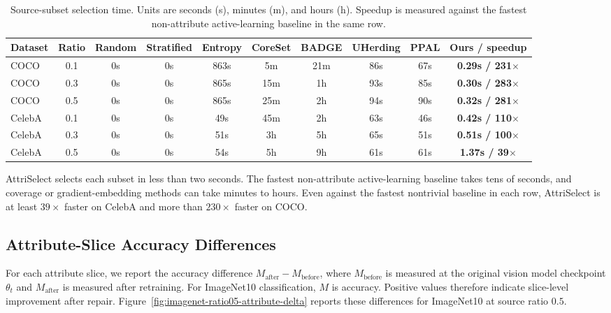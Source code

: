 \documentclass{article}
\newcommand{\model}{AttriSelect\xspace}
\begin{document}
\begin{table}[t]
\centering
\caption{Source-subset selection time. Units are seconds (s), minutes (m), and hours (h). Speedup is measured against the fastest non-attribute active-learning baseline in the same row.}
\label{tab:selection-efficiency}
\footnotesize
\setlength{\tabcolsep}{1.2pt}
\begin{tabular}{l c c c c c c c c c}
\toprule
Dataset & Ratio & Random & Stratified & Entropy & CoreSet & BADGE & UHerding & PPAL & \textbf{Ours / speedup} \\
\midrule
COCO & 0.1 & 0s & 0s & 863s & 5m & 21m & 86s & 67s & \textbf{0.29s / 231$\times$} \\
COCO & 0.3 & 0s & 0s & 865s & 15m & 1h & 93s & 85s & \textbf{0.30s / 283$\times$} \\
COCO & 0.5 & 0s & 0s & 865s & 25m & 2h & 94s & 90s & \textbf{0.32s / 281$\times$} \\
\midrule
CelebA & 0.1 & 0s & 0s & 49s & 45m & 2h & 63s & 46s & \textbf{0.42s / 110$\times$} \\
CelebA & 0.3 & 0s & 0s & 51s & 3h & 5h & 65s & 51s & \textbf{0.51s / 100$\times$} \\
CelebA & 0.5 & 0s & 0s & 54s & 5h & 9h & 61s & 61s & \textbf{1.37s / 39$\times$} \\
\bottomrule
\end{tabular}
\end{table}

\model selects each subset in less than two seconds. The fastest non-attribute
active-learning baseline takes tens of seconds, and coverage or
gradient-embedding methods can take minutes to hours. Even against the fastest
nontrivial baseline in each row, \model is at least $39\times$ faster on
CelebA and more than $230\times$ faster on COCO.

\subsection{Attribute-Slice Accuracy Differences}

For each attribute slice, we report the accuracy difference
$M_{\mathrm{after}}-M_{\mathrm{before}}$, where $M_{\mathrm{before}}$ is
measured at the original vision model checkpoint $\theta_t$ and
$M_{\mathrm{after}}$ is measured after retraining. For ImageNet10
classification, $M$ is accuracy. Positive values therefore indicate
slice-level improvement after repair. Figure~\ref{fig:imagenet-ratio05-attribute-delta} reports these differences for ImageNet10 at source ratio $0.5$.
\end{document}
